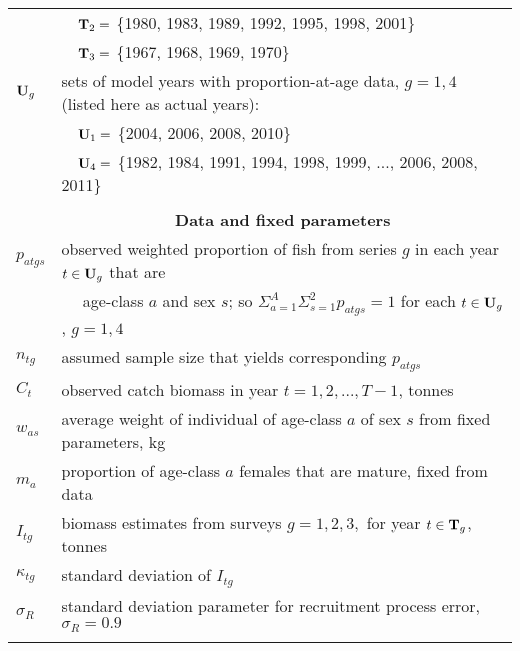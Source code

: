 \begin{tabular}{ll}
 & ~~${\bf T}_2 =$ \{1980, 1983, 1989, 1992, 1995, 1998, 2001\}\\
 & ~~${\bf T}_3 =$ \{1967, 1968, 1969, 1970\}\\
${\bf U}_g$ & sets of model years with proportion-at-age data, $g=1,4$ (listed here as actual years):\\
 & ~~${\bf U}_1 =$ \{2004, 2006, 2008, 2010\}\\
 & ~~${\bf U}_4 =$ \{1982, 1984, 1991, 1994, 1998, 1999, ..., 2006, 2008, 2011\}\\


\\[-.5ex]
& \multicolumn{1}{c}{{\bf Data and fixed parameters}} \\
$p_{atgs}$ & observed weighted proportion of fish from series $g$ in each year $t \in {\bf U}_g$ that are\\
 & ~~  age-class $a$ and sex $s$; so $\Sigma_{a=1}^{A} \Sigma_{s=1}^2 p_{atgs} = 1$ for each $t  \in {\bf U}_g$, $g=1,4$\\
$n_{tg}$ & assumed sample size that yields corresponding $p_{atgs}$\\
$C_t$ & observed catch biomass in year $t = 1, 2, ..., T-1$, tonnes\\
$w_{as}$ & average weight of individual of age-class $a$ of sex $s$ from fixed parameters, kg\\ 
$m_a$ & proportion of age-class $a$ females that are mature, fixed from data\\
$I_{tg}$ & biomass estimates from surveys $g = 1,2,3,$ for year $t \in {\bf T}_g$, tonnes\\
$\kappa_{tg}$ & standard deviation of $I_{tg}$\\
$\sigma_R$ & standard deviation parameter for recruitment process error, $\sigma_R = 0.9$ \\
%
%
 & \\
\hline
\end{tabular} \newp %



